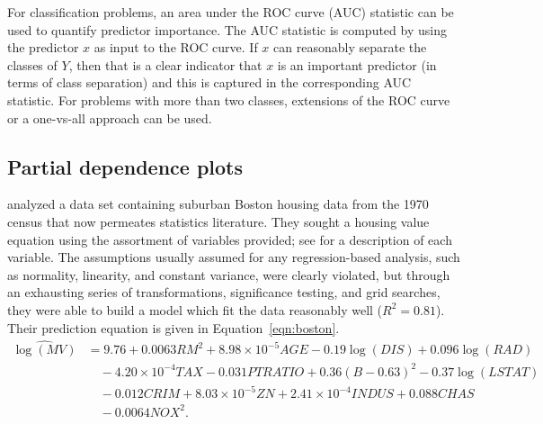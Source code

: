 \documentclass[12pt]{article}
\begin{document}
For classification problems, an area under the ROC curve (AUC) statistic can be used to quantify predictor importance. The AUC statistic is computed by using the predictor $x$ as input to the ROC curve. If $x$ can reasonably separate the classes of $Y$, then that is a clear indicator that $x$ is an important predictor (in terms of class separation) and this is captured in the corresponding AUC statistic. For problems with more than two classes, extensions of the ROC curve or a one-vs-all approach can be used.


\subsection{Partial dependence plots}


\citet{harrison-1978-hedonic} analyzed a data set containing suburban Boston housing data from the 1970 census that now permeates statistics literature. They sought a housing value equation using the assortment of variables provided; see \citet[Table IV]{harrison-1978-hedonic} for a description of each variable. The assumptions usually assumed for any regression-based analysis, such as normality, linearity, and constant variance, were clearly violated, but through an exhausting series of transformations, significance testing, and grid searches, they were able to build a model which fit the data reasonably well ($R^2 = 0.81$). Their prediction equation is given in Equation~\eqref{eqn:boston}.
\begin{equation}
\label{eqn:boston}
\begin{aligned}
\widehat{\log\left(MV\right)} &= 9.76 + 0.0063 RM^2 + 8.98\times10^{-5} AGE - 0.19\log\left(DIS\right) + 0.096\log\left(RAD\right) \\
  & \quad - 4.20\times10^{-4} TAX - 0.031 PTRATIO + 0.36\left(B - 0.63\right)^2 - 0.37\log\left(LSTAT\right) \\
  & \quad - 0.012 CRIM + 8.03\times10^{-5} ZN + 2.41\times10^{-4} INDUS + 0.088 CHAS \\
  & \quad - 0.0064 NOX^2.
\end{aligned}
\end{equation}
\end{document}
